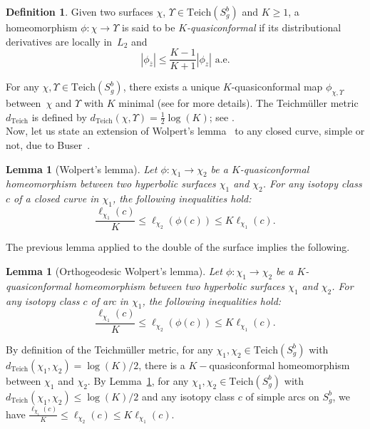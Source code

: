 \documentclass[a4paper,12pt]{article}
\newtheorem{lemme}[theorem]{Lemma}
\theoremstyle{definition}
\newtheorem{definition}[theorem]{Definition}
\theoremstyle{remark}
\begin{document}



\begin{definition}
    Given two surfaces $\chi$, $\Upsilon \in \mathrm{Teich}(S_g^b)$ and $K \geqslant 1$, a homeomorphism $\phi : \chi \to \Upsilon$ is said to be \emph{$K$-quasiconformal} if its distributional derivatives are locally in~$L_2$ and
    \[
        |\phi_{\overline{z}}|\leqslant \frac{K-1}{K+1} |\phi_{z}| \text{ a.e.}
    \]
\end{definition}

For any $\chi, \Upsilon \in \mathrm{Teich}(S_g^b)$, there exists a unique $K$-quasiconformal map $\phi_{\chi, \Upsilon}$ between~$\chi$ and $\Upsilon$ with $K$ minimal (see \cite{TeichBord} for more details). The Teichmüller metric~$d_{\mathrm{Teich}}$ is defined by $d_{\mathrm{Teich}}(\chi,\Upsilon)=\frac{1}{2}\log(K)$; see \cite{teich}. \\


Now, let us state an extension of Wolpert's lemma~\cite[12.3.2]{teich} to any closed curve, simple or not, due to Buser~\cite[Theorem~6.4.3]{buser}.

\begin{lemme}[Wolpert's lemma]\label{lemme:Wolpert}
    Let $\phi : \chi_1 \to \chi_2$ be a $K$-quasiconformal homeomorphism between two hyperbolic surfaces $\chi_1$ and $\chi_2$. For any isotopy class $c$ of a closed curve in $\chi_1$, the following inequalities hold:
    \[
        \frac{\ell_{\chi_1}(c)}{K} \leqslant \ell_{\chi_2}(\phi(c)) \leqslant K \ell_{\chi_1}(c).
    \]
\end{lemme}

The previous lemma applied to the double of the surface implies the following.

\begin{lemme}[Orthogeodesic Wolpert's lemma]\label{lemme:OrthoWolpert}
    Let $\phi : \chi_1 \to \chi_2$ be a $K$-quasiconformal homeomorphism between two hyperbolic surfaces $\chi_1$ and $\chi_2$. For any isotopy class $c$ of arc in $\chi_1$, the following inequalities hold:
    \[
        \frac{\ell_{\chi_1}(c)}{K} \leqslant \ell_{\chi_2}(\phi(c)) \leqslant K \ell_{\chi_1}(c).
    \]
\end{lemme}


By definition of the Teichmüller metric, for any $\chi_1, \chi_2 \in \mathrm{Teich}(S_g^b)$ with \\$d_{\mathrm{Teich}}(\chi_1,\chi_2) = \log(K)/2$, there is a $K-$quasiconformal homeomorphism between $\chi_1$ and $\chi_2$. By Lemma~\ref{lemme:OrthoWolpert}, for any $\chi_1, \chi_2 \in \mathrm{Teich}(S_g^b)$ with $d_{\mathrm{Teich}}(\chi_1,\chi_2) \leqslant \log(K)/2$ and any isotopy class $c$ of simple arcs on $S_g^b$, we have $ \frac{\ell_{\chi_1}(c)}{K} \leqslant \ell_{\chi_2}(c) \leqslant  K\ell_{\chi_1}(c)$.\\
\end{document}
